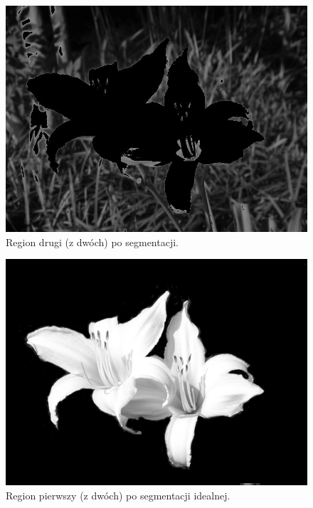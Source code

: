 \documentclass[10pt]{llncs}
\begin{document}
\begin{figure}[!htb]
  \includegraphics[width=\linewidth]{img/01_region_02.jpg}
  \caption{Region drugi (z dwóch) po segmentacji.}\label{fig:3}
\endminipage
\end{figure}

\begin{figure}[!htb]
  \includegraphics[width=\linewidth]{img/01_correct_segmentation.jpg}
  \caption{Region pierwszy (z dwóch) po segmentacji idealnej.}\label{fig:3_prim}
\endminipage\hfill
\end{figure}

\FloatBarrier
\end{document}
